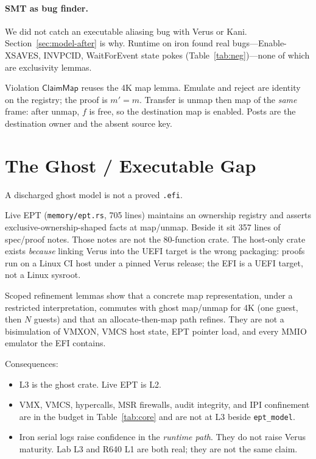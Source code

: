 \documentclass[sigplan,10pt,anonymous]{acmart}
\begin{document}
\paragraph{SMT as bug finder.}
We did not catch an executable aliasing bug with Verus or Kani.
Section~\ref{sec:model-after} is why. Runtime on iron found real
bugs---Enable-XSAVES, INVPCID, WaitForEvent state pokes
(Table~\ref{tab:neg})---none of which are exclusivity lemmas.

Violation $\mathsf{ClaimMap}$ reuses the 4K map lemma. Emulate and reject
are identity on the registry; the proof is $m'=m$. Transfer is unmap then
map of the \emph{same} frame: after unmap, $f$ is free, so the destination
map is enabled. Posts are the destination owner and the absent source
key.

\section{The Ghost / Executable Gap}

A discharged ghost model is not a proved \texttt{.efi}.

Live EPT (\texttt{memory/ept.rs}, 705 lines) maintains an ownership registry
and asserts exclusive-ownership-shaped facts at map/unmap. Beside it sit
357 lines of spec/proof notes. Those notes are not the 80-function crate. The
host-only crate exists \emph{because} linking Verus into the UEFI target is
the wrong packaging: proofs run on a Linux CI host under a pinned Verus
release; the EFI is a UEFI target, not a Linux sysroot.

Scoped refinement lemmas show that a concrete map representation, under a
restricted interpretation, commutes with ghost map/unmap for 4K (one
guest, then $N$ guests) and that an allocate-then-map path refines. They
are not a bisimulation of VMXON, VMCS host state, EPT pointer load, and
every MMIO emulator the EFI contains.

Consequences:

\begin{itemize}
\item L3 is the ghost crate. Live EPT is L2.
\item VMX, VMCS, hypercalls, MSR firewalls, audit integrity, and IPI
  confinement are in the budget in Table~\ref{tab:core} and are not at L3
  beside \texttt{ept\_model}.
\item Iron serial logs raise confidence in the \emph{runtime path}. They do
  not raise Verus maturity. Lab L3 and R640 L1 are both real; they are not
  the same claim.
\end{itemize}
\end{document}
